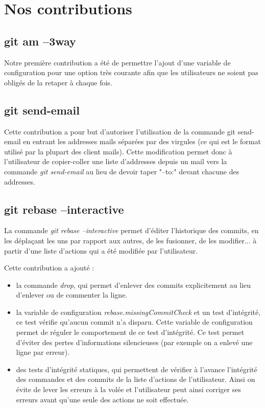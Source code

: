 \documentclass[a4paper, 12pt]{article}
\newcommand{\gitcmd}[1]{\emph{#1}}
\begin{document}
\section{Nos contributions}

\subsection{git am --3way}

Notre première contribution a été de permettre l'ajout d'une variable de configuration pour une option très courante afin que les utilisateurs ne soient pas obligés de la retaper à chaque fois.

\subsection{git send-email}

Cette contribution a pour but d'autoriser l'utilisation de la commande git send-email en entrant les addresses mails séparées par des virgules (ce qui est le format utilisé par la plupart des client mails). Cette modification permet donc à l'utilisateur de copier-coller une liste d'addresses depuis un mail vers la commande \gitcmd{git send-email} au lieu de devoir taper "--to:" devant chacune des addresses.

\subsection{git rebase --interactive}

La commande \gitcmd{git rebase --interactive} permet d'éditer l'historique des commits, en les déplaçant les uns par rapport aux autres, de les fusionner, de les modifier... à partir d'une liste d'actions qui a été modifiée par l'utilisateur.

Cette contribution a ajouté :
\begin{itemize}
\item la commande \textit{drop}, qui permet d'enlever des commits explicitement au lieu d'enlever ou de commenter la ligne.
\item la variable de configuration \textit{rebase.missingCommitCheck} et un test d'intégrité, ce test vérifie qu'aucun commit n'a disparu. Cette variable de configuration permet de réguler le comportement de ce test d'intégrité. Ce test permet d'éviter des pertes d'informations silencieuses (par exemple on a enlevé une ligne par erreur).
\item des tests d'intégrité statiques, qui permettent de vérifier à l'avance l'intégrité des commandes et des commits de la liste d'actions de l'utilisateur. Ainsi on évite de lever les erreurs à la volée et l'utilisateur peut ainsi corriger ses erreurs avant qu'une seule des actions ne soit effectuée.
\end{itemize}
\end{document}
